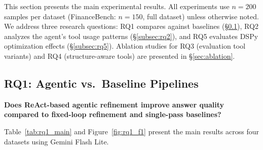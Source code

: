 
This section presents the main experimental results.
All experiments use $n = 200$ samples per dataset (FinanceBench: $n = 150$, full dataset) unless otherwise noted.
We address three research questions: RQ1 compares \ours{} against baselines (\S\ref{subsec:rq1}), RQ2 analyzes the agent's tool usage patterns (\S\ref{subsec:rq2}), and RQ5 evaluates DSPy optimization effects (\S\ref{subsec:rq5}).
Ablation studies for RQ3 (evaluation tool variants) and RQ4 (structure-aware tools) are presented in \S\ref{sec:ablation}.

\subsection{RQ1: Agentic vs.\ Baseline Pipelines}
\label{subsec:rq1}

\textbf{Does ReAct-based agentic refinement improve answer quality compared to fixed-loop refinement and single-pass baselines?}

Table~\ref{tab:rq1_main} and Figure~\ref{fig:rq1_f1} present the main results across four datasets using Gemini Flash Lite.



